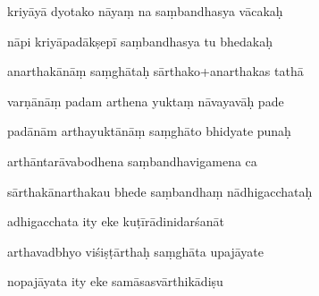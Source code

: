 \documentclass[article,12pt,a4paper]{memoir}%
\newcounter{parCount}
\begin{document}
	  
	  \pstart {} kriyāyā dyotako nāyaṃ na saṃbandhasya vācakaḥ 
	{}
	\pend%
      

	  
	  \pstart \leavevmode%
	nāpi kriyāpadākṣepī saṃbandhasya tu bhedakaḥ 
	{}
	\pend%
      

	  
	  \pstart {} anarthakānāṃ saṃghātaḥ sārthako+anarthakas tathā 
	{}
	\pend%
      

	  
	  \pstart \leavevmode%
	varṇānāṃ padam arthena yuktaṃ nāvayavāḥ pade 
	{}
	\pend%
      

	  
	  \pstart {} padānām arthayuktānāṃ saṃghāto bhidyate punaḥ 
	{}
	\pend%
      

	  
	  \pstart \leavevmode%
	arthāntarāvabodhena saṃbandhavigamena ca 
	{}
	\pend%
      

	  
	  \pstart {} sārthakānarthakau bhede saṃbandhaṃ nādhigacchataḥ 
	{}
	\pend%
      

	  
	  \pstart \leavevmode%
	adhigacchata ity eke kuṭīrādinidarśanāt 
	{}
	\pend%
      

	  
	  \pstart {} arthavadbhyo viśiṣṭārthaḥ saṃghāta upajāyate 
	{}
	\pend%
      

	  
	  \pstart \leavevmode%
	nopajāyata ity eke samāsasvārthikādiṣu 
	{}
	\pend%
      
\end{document}
